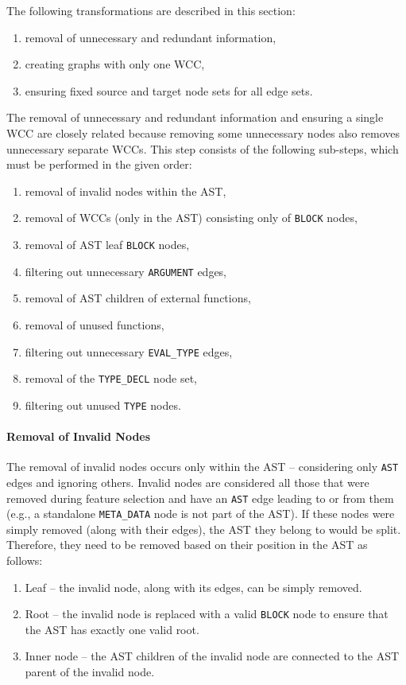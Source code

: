 The following transformations are described in this section:
\begin{enumerate}
    \item removal of unnecessary and redundant information,
    \item creating graphs with only one WCC,
    \item ensuring fixed source and target node sets for all edge sets.
\end{enumerate}

The removal of unnecessary and redundant information and ensuring a single WCC are closely related because removing some unnecessary nodes also removes unnecessary separate WCCs. This step consists of the following sub-steps, which must be performed in the given order:
\begin{enumerate}
    \item removal of invalid nodes within the AST,
    \item removal of WCCs (only in the AST) consisting only of \texttt{BLOCK} nodes,
    \item removal of AST leaf \texttt{BLOCK} nodes,
    \item filtering out unnecessary \texttt{ARGUMENT} edges,
    \item removal of AST children of external functions,
    \item removal of unused functions,
    \item filtering out unnecessary \texttt{EVAL\_TYPE} edges,
    \item removal of the \texttt{TYPE\_DECL} node set,
    \item filtering out unused \texttt{TYPE} nodes.
\end{enumerate}

\paragraph{Removal of Invalid Nodes}
The removal of invalid nodes occurs only within the AST -- considering only \texttt{AST} edges and ignoring others. Invalid nodes are considered all those that were removed during feature selection and have an \texttt{AST} edge leading to or from them (e.g., a standalone \texttt{META\_DATA} node is not part of the AST). If these nodes were simply removed (along with their edges), the AST they belong to would be split. Therefore, they need to be removed based on their position in the AST as follows:
\begin{enumerate}
    \item Leaf -- the invalid node, along with its edges, can be simply removed.
    \item Root -- the invalid node is replaced with a valid \texttt{BLOCK} node to ensure that the AST has exactly one valid root.
    \item Inner node -- the AST children of the invalid node are connected to the AST parent of the invalid node.
\end{enumerate}


